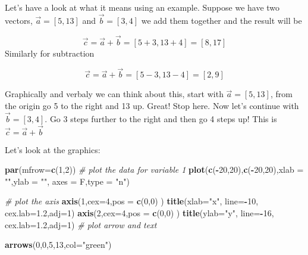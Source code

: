 \documentclass[
]{book}
\newenvironment{Shaded}{\begin{snugshade}}{\end{snugshade}}
\newcommand{\CommentTok}[1]{\textcolor[rgb]{0.56,0.35,0.01}{\textit{#1}}}
\newcommand{\DataTypeTok}[1]{\textcolor[rgb]{0.13,0.29,0.53}{#1}}
\newcommand{\DecValTok}[1]{\textcolor[rgb]{0.00,0.00,0.81}{#1}}
\newcommand{\FloatTok}[1]{\textcolor[rgb]{0.00,0.00,0.81}{#1}}
\newcommand{\KeywordTok}[1]{\textcolor[rgb]{0.13,0.29,0.53}{\textbf{#1}}}
\newcommand{\NormalTok}[1]{#1}
\newcommand{\OperatorTok}[1]{\textcolor[rgb]{0.81,0.36,0.00}{\textbf{#1}}}
\newcommand{\StringTok}[1]{\textcolor[rgb]{0.31,0.60,0.02}{#1}}
\theoremstyle{definition}
\theoremstyle{definition}
\theoremstyle{definition}
\theoremstyle{remark}
\begin{document}
Let's have a look at what it means using an example. Suppose we have two vectors, \(\vec{a}=[5,13]\) and \(\vec{b}=[3,4]\) we add them together and the result will be

\[\vec{c}=\vec{a}+\vec{b}=[5+3, 13+4]=[8,17]\]
Similarly for subtraction

\[\vec{c}=\vec{a}+\vec{b}=[5-3, 13-4]=[2,9]\]

Graphically and verbaly we can think about this, start with \(\vec{a}=[5,13]\), from the origin go 5 to the right and 13 up. Great! Stop here. Now let's continue with \(\vec{b}=[3,4]\). Go 3 steps further to the right and then go 4 steps up! This is \(\vec{c}=\vec{a}+\vec{b}\)

Let's look at the graphics:

\begin{Shaded}
\begin{Highlighting}[]
\KeywordTok{par}\NormalTok{(}\DataTypeTok{mfrow=}\KeywordTok{c}\NormalTok{(}\DecValTok{1}\NormalTok{,}\DecValTok{2}\NormalTok{))}
\CommentTok{# plot the data for variable 1}
\KeywordTok{plot}\NormalTok{(}\KeywordTok{c}\NormalTok{(}\OperatorTok{-}\DecValTok{20}\NormalTok{,}\DecValTok{20}\NormalTok{),}\KeywordTok{c}\NormalTok{(}\OperatorTok{-}\DecValTok{20}\NormalTok{,}\DecValTok{20}\NormalTok{),}\DataTypeTok{xlab =} \StringTok{""}\NormalTok{,}\DataTypeTok{ylab =} \StringTok{""}\NormalTok{,}
 \DataTypeTok{axes =}\NormalTok{ F,}\DataTypeTok{type =} \StringTok{"n"}\NormalTok{)}

\CommentTok{# plot the axis}
\KeywordTok{axis}\NormalTok{(}\DecValTok{1}\NormalTok{,}\DataTypeTok{cex=}\DecValTok{4}\NormalTok{,}\DataTypeTok{pos =} \KeywordTok{c}\NormalTok{(}\DecValTok{0}\NormalTok{,}\DecValTok{0}\NormalTok{) )}
\KeywordTok{title}\NormalTok{(}\DataTypeTok{xlab=}\StringTok{"x"}\NormalTok{, }\DataTypeTok{line=}\OperatorTok{-}\DecValTok{10}\NormalTok{, }\DataTypeTok{cex.lab=}\FloatTok{1.2}\NormalTok{,}\DataTypeTok{adj=}\DecValTok{1}\NormalTok{)}
\KeywordTok{axis}\NormalTok{(}\DecValTok{2}\NormalTok{,}\DataTypeTok{cex=}\DecValTok{4}\NormalTok{,}\DataTypeTok{pos =} \KeywordTok{c}\NormalTok{(}\DecValTok{0}\NormalTok{,}\DecValTok{0}\NormalTok{) )}
\KeywordTok{title}\NormalTok{(}\DataTypeTok{ylab=}\StringTok{"y"}\NormalTok{, }\DataTypeTok{line=}\OperatorTok{-}\DecValTok{16}\NormalTok{, }\DataTypeTok{cex.lab=}\FloatTok{1.2}\NormalTok{,}\DataTypeTok{adj=}\DecValTok{1}\NormalTok{)}
\CommentTok{# plot arrow and text}

\KeywordTok{arrows}\NormalTok{(}\DecValTok{0}\NormalTok{,}\DecValTok{0}\NormalTok{,}\DecValTok{5}\NormalTok{,}\DecValTok{13}\NormalTok{,}\DataTypeTok{col=}\StringTok{"green"}\NormalTok{)}


\end{Highlighting}
\end{Shaded}
\end{document}
